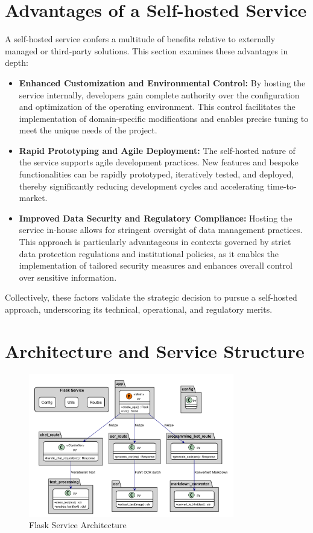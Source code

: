 \section{Advantages of a Self-hosted Service}
A self-hosted service confers a multitude of benefits relative to externally managed or third-party solutions. This section examines these advantages in depth:
\begin{itemize}
    \item \textbf{Enhanced Customization and Environmental Control:} By hosting the service internally, developers gain complete authority over the configuration and optimization of the operating environment. This control facilitates the implementation of domain-specific modifications and enables precise tuning to meet the unique needs of the project.
    \item \textbf{Rapid Prototyping and Agile Deployment:} The self-hosted nature of the service supports agile development practices. New features and bespoke functionalities can be rapidly prototyped, iteratively tested, and deployed, thereby significantly reducing development cycles and accelerating time-to-market.
    \item \textbf{Improved Data Security and Regulatory Compliance:} Hosting the service in-house allows for stringent oversight of data management practices. This approach is particularly advantageous in contexts governed by strict data protection regulations and institutional policies, as it enables the implementation of tailored security measures and enhances overall control over sensitive information.
\end{itemize}
Collectively, these factors validate the strategic decision to pursue a self-hosted approach, underscoring its technical, operational, and regulatory merits.


\section{Architecture and Service Structure}

\begin{figure}[h]
    \centering
    \includegraphics[width=0.8\textwidth]{figures/flask_service.png}
    \caption{Flask Service Architecture}
    \label{fig:flask_service_architecture}
\end{figure}


